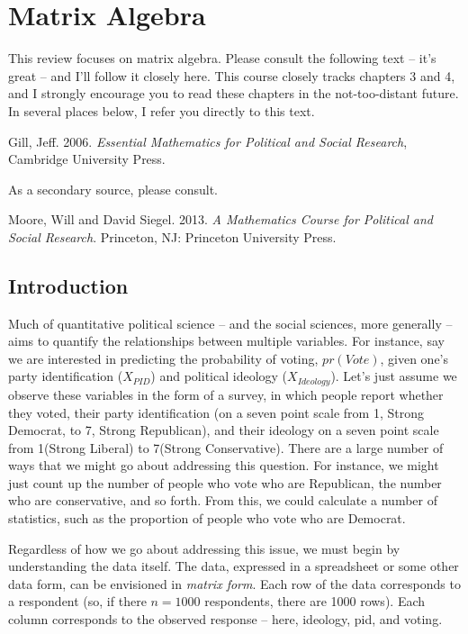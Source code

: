 \documentclass[
]{book}
\begin{document}
\chapter{Matrix Algebra}\label{matrix-algebra}

This review focuses on matrix algebra. Please consult the following text
-- it's great -- and I'll follow it closely here. This course closely
tracks chapters 3 and 4, and I strongly encourage you to read these
chapters in the not-too-distant future. In several places below, I refer
you directly to this text.

Gill, Jeff. 2006. \emph{Essential Mathematics for Political and Social
Research}, Cambridge University Press.

As a secondary source, please consult.

Moore, Will and David Siegel. 2013. \emph{A Mathematics Course for Political
and Social Research}. Princeton, NJ: Princeton University Press.

\section{Introduction}\label{introduction}

Much of quantitative political science -- and the social sciences, more
generally -- aims to quantify the relationships between multiple
variables. For instance, say we are interested in predicting the
probability of voting, \(pr(Vote)\), given one's party identification
(\(X_{PID}\)) and political ideology (\(X_{Ideology}\)). Let's just assume
we observe these variables in the form of a survey, in which people
report whether they voted, their party identification (on a seven point
scale from 1, Strong Democrat, to 7, Strong Republican), and their
ideology on a seven point scale from 1(Strong Liberal) to 7(Strong
Conservative). There are a large number of ways that we might go about
addressing this question. For instance, we might just count up the
number of people who vote who are Republican, the number who are
conservative, and so forth. From this, we could calculate a number of
statistics, such as the proportion of people who vote who are Democrat.

Regardless of how we go about addressing this issue, we must begin by
understanding the data itself. The data, expressed in a spreadsheet or
some other data form, can be envisioned in \emph{matrix form}. Each row of
the data corresponds to a respondent (so, if there \(n=1000\) respondents,
there are 1000 rows). Each column corresponds to the observed response
-- here, ideology, pid, and voting.
\end{document}
